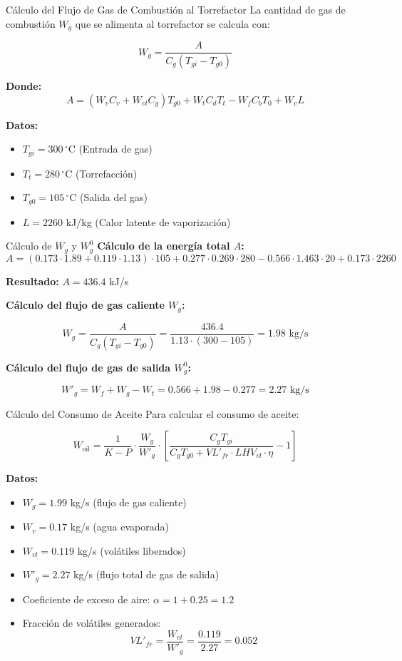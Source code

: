 \documentclass[main.tex]{subfiles}
\begin{document}
\begin{frame}{Cálculo del Flujo de Gas de Combustión al Torrefactor}
La cantidad de gas de combustión $W_g$ que se alimenta al torrefactor se calcula con:

\[
W_g = \frac{A}{C_g (T_{gi} - T_{g0})}
\]

\textbf{Donde:}
\[
A = (W_v C_v + W_{vl} C_g) T_{g0} + W_t C_d T_t - W_f C_b T_0 + W_v L
\]

\textbf{Datos:}
\begin{itemize}
  \item $T_{gi} = 300\,^\circ$C \quad (Entrada de gas)
  \item $T_t = 280\,^\circ$C \quad (Torrefacción)
  \item $T_{g0} = 105\,^\circ$C \quad (Salida del gas)
  \item $L = 2260$ kJ/kg \quad (Calor latente de vaporización)
\end{itemize}
\end{frame}


\begin{frame}{Cálculo de $W_g$ y $W_g^0$}
\textbf{Cálculo de la energía total $A$:}
\[
A = (0.173 \cdot 1.89 + 0.119 \cdot 1.13) \cdot 105 + 0.277 \cdot 0.269 \cdot 280 - 0.566 \cdot 1.463 \cdot 20 + 0.173 \cdot 2260
\]

\textbf{Resultado:} $A = 436.4$ kJ/s

\textbf{Cálculo del flujo de gas caliente $W_g$:}

\[
W_g = \frac{A}{C_g (T_{gi} - T_{g0})} = \frac{436.4}{1.13 \cdot (300 - 105)} = 1.98 \text{ kg/s}
\]

\textbf{Cálculo del flujo de gas de salida $W_g^0$:}

\[
W'_g = W_f + W_g - W_t = 0.566 + 1.98 - 0.277 = 2.27 \text{ kg/s}
\]
\end{frame}

\begin{frame}{Cálculo del Consumo de Aceite}
Para calcular el consumo de aceite:

\[
W_{\text{oil}} = \frac{1}{K - P} \cdot \frac{W_g}{W'_g} \cdot\left[ \frac{C_g T_{gi}}{C_g T_{g0} + VL'_{fr} \cdot LHV_{vl} \cdot \eta} - 1\right]
\]

\textbf{Datos:}

\begin{itemize}
\footnotesize
  \item $W_g = 1.99$ kg/s (flujo de gas caliente)
  \item $W_v = 0.17$ kg/s (agua evaporada)
  \item $W_{vl} = 0.119$ kg/s (volátiles liberados)
  \item $W'_g = 2.27$ kg/s (flujo total de gas de salida)
  \item Coeficiente de exceso de aire: $\alpha = 1 + 0.25 = 1.2$
  \item Fracción de volátiles generados:
  \[
    VL'_{fr} = \frac{W_{vl}}{W'_g} = \frac{0.119}{2.27} = 0.052
  \]
\end{itemize}
\end{frame}
\end{document}

